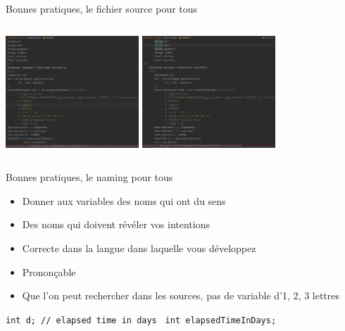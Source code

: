 \documentclass{beamer}
\begin{document}
    \begin{frame}{Bonnes pratiques, le fichier source pour tous}

        \begin{columns}
            \centering
            \includegraphics[width=5cm]{image/numerous-identations}
            \centering
            \includegraphics[width=5cm]{image/one-identation}
        \end{columns}

    \end{frame}

    \begin{frame}{Bonnes pratiques, le naming pour tous}

        \begin{itemize}

            \item Donner aux variables des noms qui ont du sens
            \item Des noms qui doivent révéler vos intentions
            \item Correcte dans la langue dans laquelle vous développez
            \item Prononçable
            \item Que l'on peut rechercher dans les sources, pas de variable d'1, 2, 3 lettres

        \end{itemize}
        \bigbreak

        \quad\texttt{int d; // elapsed time in days }\quad{}
        \bigbreak
        \quad\texttt{int elapsedTimeInDays; }\quad{}
    \end{frame}
\end{document}
